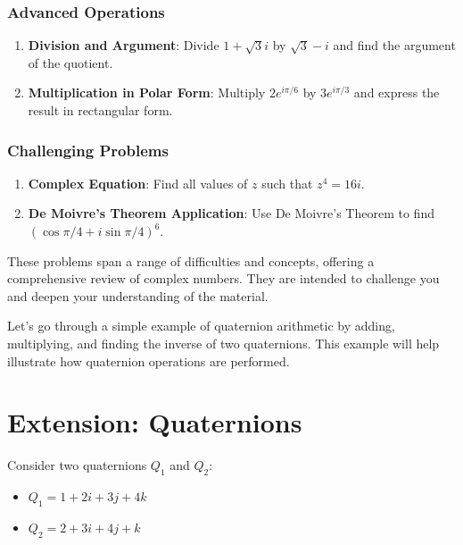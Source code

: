 \documentclass[
]{article}
\providecommand{\tightlist}{%
  \setlength{\itemsep}{0pt}\setlength{\parskip}{0pt}}
\let\oldsection\section
\renewcommand{\section}[1]{\clearpage\oldsection{#1}}
\def\tightlist{}
\begin{document}
\subsubsection{Advanced Operations}\label{advanced-operations}

\begin{enumerate}
\def\labelenumi{\arabic{enumi}.}
\setcounter{enumi}{16}
\tightlist
\item
  \textbf{Division and Argument}: Divide \(1 + \sqrt{3}i\) by
  \(\sqrt{3} - i\) and find the argument of the quotient.
\item
  \textbf{Multiplication in Polar Form}: Multiply \(2e^{i\pi/6}\) by
  \(3e^{i\pi/3}\) and express the result in rectangular form.
\end{enumerate}

\subsubsection{Challenging Problems}\label{challenging-problems}

\begin{enumerate}
\def\labelenumi{\arabic{enumi}.}
\setcounter{enumi}{18}
\tightlist
\item
  \textbf{Complex Equation}: Find all values of \(z\) such that
  \(z^4 = 16i\).
\item
  \textbf{De Moivre's Theorem Application}: Use De Moivre's Theorem to
  find \((\cos \pi/4 + i\sin \pi/4)^6\).
\end{enumerate}

These problems span a range of difficulties and concepts, offering a
comprehensive review of complex numbers. They are intended to challenge
you and deepen your understanding of the material.

Let's go through a simple example of quaternion arithmetic by adding,
multiplying, and finding the inverse of two quaternions. This example
will help illustrate how quaternion operations are performed.

\section{Extension: Quaternions}\label{extension-quaternions}

Consider two quaternions \(Q_1\) and \(Q_2\):

\begin{itemize}
\tightlist
\item
  \(Q_1 = 1 + 2i + 3j + 4k\)
\item
  \(Q_2 = 2 + 3i + 4j + k\)
\end{itemize}
\end{document}
